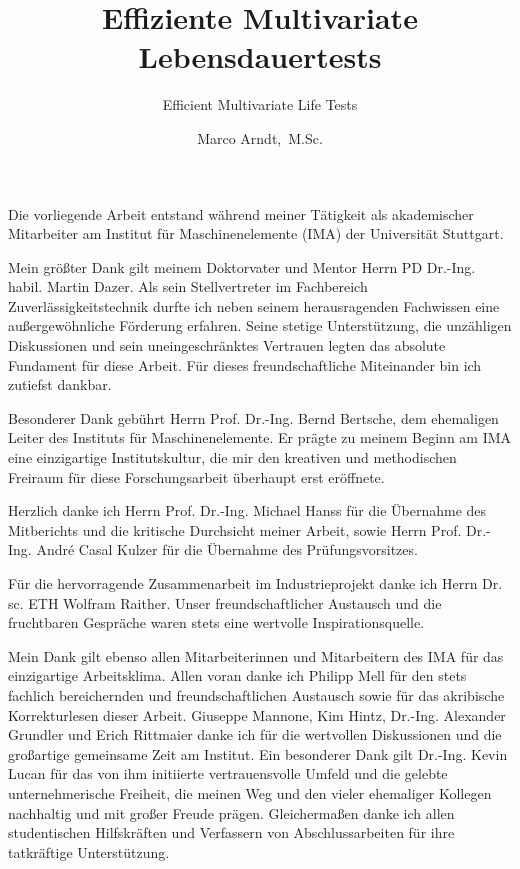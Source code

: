 \documentclass[
 print,%
english, ngerman,%
smallfont, %
twoside, %
toc=bib,
BCOR=6mm, %
]{isw_smb_diss} %
\title{Effiziente Multivariate Lebensdauertests}
\subtitle{Efficient Multivariate Life Tests}
\author{Marco Arndt,~M.Sc.}
\institute{Institut für Maschinenelemente}
\numberwithin{equation}{chapter} %
\begin{document}
\frontmatter
\maketitle
\onehalfspacing %


\vspace{-0.5cm}

Die vorliegende Arbeit entstand während meiner Tätigkeit als akademischer Mitarbeiter am Institut für Maschinenelemente (IMA) der Universität Stuttgart.

Mein größter Dank gilt meinem Doktorvater und Mentor Herrn PD Dr.-Ing. habil. Martin Dazer.
Als sein Stellvertreter im Fachbereich Zuverlässigkeitstechnik durfte ich neben seinem herausragenden Fachwissen eine außergewöhnliche Förderung erfahren.
Seine stetige Unterstützung, die unzähligen Diskussionen und sein uneingeschränktes Vertrauen legten das absolute Fundament für diese Arbeit.
Für dieses freundschaftliche Miteinander bin ich zutiefst dankbar.

Besonderer Dank gebührt Herrn Prof. Dr.-Ing. Bernd Bertsche, dem ehemaligen Leiter des Instituts für Maschinenelemente.
Er prägte zu meinem Beginn am IMA eine einzigartige Institutskultur, die mir den kreativen und methodischen Freiraum für diese Forschungsarbeit überhaupt erst eröffnete.

Herzlich danke ich Herrn Prof. Dr.-Ing. Michael Hanss für die Übernahme des Mitberichts und die kritische Durchsicht meiner Arbeit, sowie Herrn Prof. Dr.-Ing. André Casal Kulzer für die Übernahme des Prüfungsvorsitzes.

Für die hervorragende Zusammenarbeit im Industrieprojekt danke ich Herrn Dr. sc. ETH Wolfram Raither.
Unser freundschaftlicher Austausch und die fruchtbaren Gespräche waren stets eine wertvolle Inspirationsquelle.

Mein Dank gilt ebenso allen Mitarbeiterinnen und Mitarbeitern des IMA für das einzigartige Arbeitsklima.
Allen voran danke ich Philipp Mell für den stets fachlich bereichernden und freundschaftlichen Austausch sowie für das akribische Korrekturlesen dieser Arbeit.
Giuseppe Mannone, Kim Hintz, Dr.-Ing. Alexander Grundler und Erich Rittmaier danke ich für die wertvollen Diskussionen und die großartige gemeinsame Zeit am Institut.
Ein besonderer Dank gilt Dr.-Ing. Kevin Lucan für das von ihm initiierte vertrauensvolle Umfeld und die gelebte unternehmerische Freiheit, die meinen Weg und den vieler ehemaliger Kollegen nachhaltig und mit großer Freude prägen.
Gleichermaßen danke ich allen studentischen Hilfskräften und Verfassern von Abschlussarbeiten für ihre tatkräftige Unterstützung.
\end{document}
